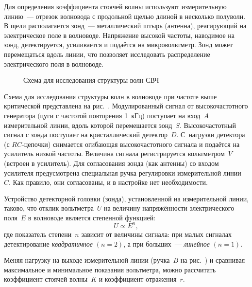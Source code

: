 
Для определения коэффициента стоячей волны используют измерительную
линию~--- отрезок волновода с продольной щелью длиной в несколько полуволн. В
щели располагается зонд~--- металлический штырь (антенна), реагирующий
на электрическое поле в волноводе. Напряжение высокой частоты, наводимое на
зонд, детектируется, усиливается и подаётся на микровольтметр. Зонд может
перемещаться вдоль линии, что позволяет исследовать распределение 
электрического поля в волноводе.

\begin{figure}[h!]
    \centering
    {\small{}}
    \caption{Схема для исследования структуры волн СВЧ} 
\end{figure}

Схема для исследования структуры волн в волноводе при частоте выше
критической представлена на рис.~. Модулированный
сигнал от высокочастотного генератора (цуги с частотой повторения 1~кГц)
поступает на вход~$A$ измерительной линии, вдоль которой перемешается зонд~$S$.
Высокочастотный сигнал с зонда поступает на кристаллический 
детектор~$D$.
С~нагрузки детектора (с $RC$-цепочки) снимается огибающая высокочастотного
сигнала и подаётся на усилитель низкой частоты. Величина сигнала регистрируется
вольтметром~$V$ (встроен в усилитель). 
Для согласования зонда (как антенны) со входом усилителя 
предусмотрена специальная ручка регулировки измерительной линии~$C$. 
Как правило, они согласованы, и в настройке нет необходимости. 




Устройство детекторной головки (зонда), установленной на измерительной линии, 
таково, что отклик вольтметра~$U$ на величину напряжённости электрического 
поля~$E$ в волноводе является степенной функцией:
\begin{equation*} 
U\propto E^{n}, 
\end{equation*}
где показатель степени~$n$ зависит от величины сигнала: 
при малых сигналах детектирование \emph{квадратичное} $(n=2)$, 
а при больших~--- \emph{линейное} $(n=1)$.

Меняя нагрузку на выходе измерительной линии (ручка~$B$ 
на рис.~) и сравнивая максимальное 
и минимальное показания вольтметра, можно рассчитать коэффициент 
стоячей волны~$K$ и коэффициент отражения~$r$.


